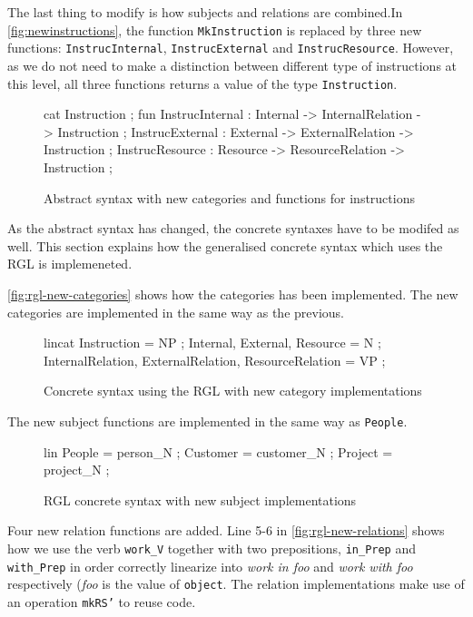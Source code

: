 The last thing to modify is how subjects and relations are combined.In \autoref{fig:newinstructions}, the function \texttt{MkInstruction} is replaced by three new functions: \texttt{InstrucInternal}, \texttt{InstrucExternal} and \texttt{InstrucResource}. However, as we do not need to make a distinction between different type of instructions at this level, all three functions returns a value of the type \texttt{Instruction}.

\begin{figure}[H]
\begin{code}
cat
  Instruction ;
fun
  InstrucInternal : Internal -> InternalRelation -> Instruction ;
  InstrucExternal : External -> ExternalRelation -> Instruction ;
  InstrucResource : Resource -> ResourceRelation -> Instruction ;
\end{code}
\caption{Abstract syntax with new categories and functions for instructions\label{fig:newinstructions}}
\end{figure}

As the abstract syntax has changed, the concrete syntaxes have to be modifed as well. This section explains how the generalised concrete syntax which uses the RGL is implemeneted. 

\autoref{fig:rgl-new-categories} shows how the categories has been implemented. The new categories are implemented in the same way as the previous.

\begin{figure}[H]
\begin{code}
lincat
  Instruction = NP ;
  Internal, External, Resource = N ;
  InternalRelation, ExternalRelation, ResourceRelation = VP ;
\end{code}
\caption{Concrete syntax using the RGL with new category implementations\label{fig:rgl-new-categories}}
\end{figure}

The new subject functions are implemented in the same way as \texttt{People}.

\begin{figure}[H]
\begin{code}
lin
  People = person_N ;
  Customer = customer_N ;
  Project = project_N ;
\end{code}
\caption{RGL concrete syntax with new subject implementations\label{fig:rgl-new-subjects}}
\end{figure}

Four new relation functions are added. Line 5-6 in \autoref{fig:rgl-new-relations} shows how we use the verb \texttt{work\_V} together with two prepositions, \texttt{in\_Prep} and \texttt{with\_Prep} in order correctly linearize into \emph{work in foo} and \emph{work with foo} respectively (\emph{foo} is the value of \texttt{object}. The relation implementations make use of an operation \texttt{mkRS'} to reuse code.

